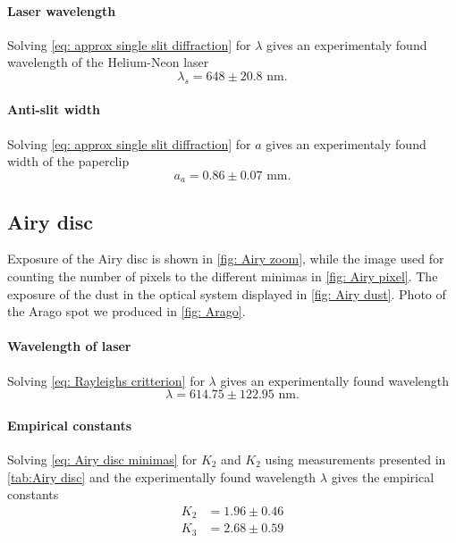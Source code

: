 \documentclass{emulateapj}
\begin{document}
\paragraph{Laser wavelength} Solving \cref{eq: approx single slit diffraction} for $\lambda$ gives an experimentaly found wavelength of the Helium-Neon laser
\begin{equation*}
\lambda_s = 648 \pm 20.8 \text{ nm}.
\end{equation*}

\paragraph{Anti-slit width} Solving \cref{eq: approx single slit diffraction} for $a$ gives an experimentaly found width of the paperclip
\begin{equation*}
a_a = 0.86 \pm 0.07 \text{ mm}.
\end{equation*}

\subsection{Airy disc}
\label{subsec: Result Airy disc}
Exposure of the Airy disc is shown in \cref{fig: Airy zoom}, while the image used for counting the number of pixels to the different minimas in \cref{fig: Airy pixel}. The exposure of the dust in the optical system displayed in \cref{fig: Airy dust}. Photo of the Arago spot we produced in \cref{fig: Arago}. 
\paragraph{Wavelength of laser} Solving \cref{eq: Rayleighs critterion} for $\lambda$ gives an experimentally found wavelength
\begin{equation}
\lambda = 614.75 \pm 122.95 \text{ nm}.
\label{eq: Results lambda airy}
\end{equation}
\paragraph{Empirical constants} Solving \cref{eq: Airy disc minimas} for $K_2$ and $K_2$ using measurements presented in \cref{tab:Airy disc} and the experimentally found wavelength $\lambda$ gives the empirical constants
\begin{align}
K_2 &= 1.96 \pm 0.46
\\
K_3 &= 2.68 \pm 0.59
\end{align}
\end{document}
